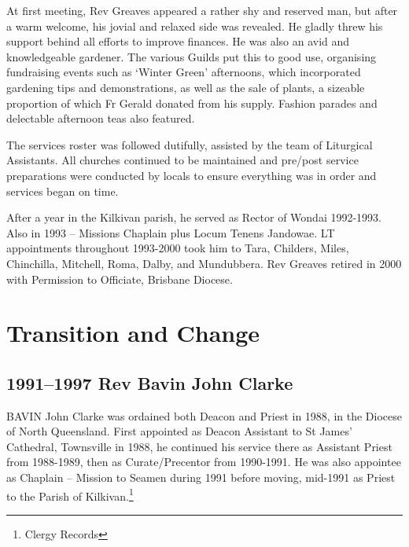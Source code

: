At first meeting, Rev Greaves appeared a rather shy and reserved man, but after a warm welcome, his jovial and relaxed side was revealed. He gladly threw his support behind all efforts to improve finances. He was also an avid and knowledgeable gardener. The various Guilds put this to good use, organising fundraising events such as `Winter Green' afternoons, which incorporated gardening tips and demonstrations, as well as the sale of plants, a sizeable proportion of which Fr Gerald donated from his supply. Fashion parades and delectable afternoon teas also featured.



The services roster was followed dutifully, assisted by the team of Liturgical Assistants. All churches continued to be maintained and pre/post service preparations were conducted by locals to ensure everything was in order and services began on time.



After a year in the Kilkivan parish, he served as Rector of Wondai 1992-1993. Also in 1993 -- Missions Chaplain plus Locum Tenens Jandowae. LT appointments throughout 1993-2000 took him to Tara, Childers, Miles, Chinchilla, Mitchell, Roma, Dalby, and Mundubbera. Rev Greaves retired in 2000 with Permission to Officiate, Brisbane Diocese.



\balance


\printendnotes[custom]
\setcounter{endnote}{0}
\chapter{Transition and Change}
\nobalance


\section{1991--1997 Rev Bavin John Clarke}



\lettrine[lines=3]{B}{AVIN}
 John Clarke was ordained both Deacon and Priest in 1988, in the Diocese of North Queensland. First appointed as Deacon Assistant to St James' Cathedral, Townsville in 1988, he continued his service there as Assistant Priest from 1988-1989, then as Curate/Precentor from 1990-1991. He was also appointee as Chaplain -- Mission to Seamen during 1991 before moving, mid-1991 as Priest to the Parish of Kilkivan.\footnote{Clergy Records}







